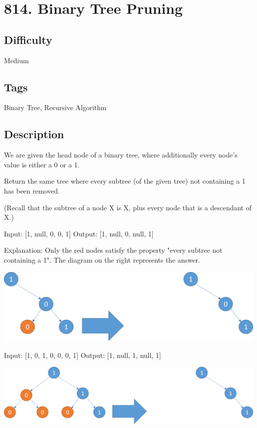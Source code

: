 \tocless\section{814. Binary Tree Pruning}
\label{algo:814}

\subsection*{Difficulty}
Medium

\subsection*{Tags}
Binary Tree, Recursive Algorithm

\subsection*{Description}
We are given the head node  of a binary tree, where additionally every node's value is either a 0 or a 1.

Return the same tree where every subtree (of the given tree) not containing a 1 has been removed.

(Recall that the subtree of a node X is X, plus every node that is a descendant of X.)
\begin{example}
\begin{multilinecode}
Input: [1, null, 0, 0, 1]
Output: [1, null, 0, null, 1]

Explanation:
Only the red nodes satisfy the property "every subtree not containing a 1".
The diagram on the right represents the answer.
\end{multilinecode}
\includegraphics*[width=14cm]{figs/algo_814_1}
\end{example}

\begin{example}
\begin{multilinecode}
Input: [1, 0, 1, 0, 0, 0, 1]
Output: [1, null, 1, null, 1]
\end{multilinecode}
\includegraphics*[width=14cm]{figs/algo_814_2}
\end{example}

